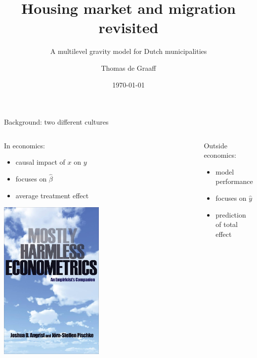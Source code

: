\documentclass{beamer}
\title{Housing market and migration revisited}
\subtitle{A multilevel gravity model for Dutch municipalities}
\date{\today}
\author{Thomas de Graaff}
\institute{Vrije Universiteit Amsterdam\\Department of Spatial Economics}
\begin{document}
\maketitle

\begin{frame}{Background: two different cultures \citep{breiman2001statistical}}
	\begin{columns}
		\begin{column}{0.5\textwidth}
			In economics: 
			\begin{itemize}
				\item \alert{causal} impact of $x$ on $y$
				\item \alert{focuses} on $\hat{\beta}$
				\item \alert{average} treatment effect
		    \end{itemize}
			\begin{center}
				\includegraphics[width=0.5\textwidth]{../fig/harmless}      
			\end{center}
		\end{column}\pause
		\begin{column}{0.5\textwidth} 
		Outside economics: 
			\begin{itemize}
				\item \alert{model performance } 
				\item \alert{focuses} on $\hat{y}$
				\item \alert{prediction} of total effect
			\end{itemize}
			\begin{center}

\end{center}
\end{column}
\end{columns}
\end{frame}
\end{document}
